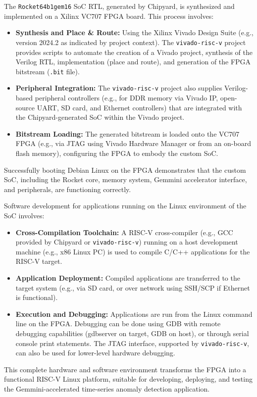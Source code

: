 The \texttt{Rocket64b1gem16} SoC RTL, generated by Chipyard, is synthesized and implemented on a Xilinx VC707 FPGA board. This process involves:
\begin{itemize}
    \item \textbf{Synthesis and Place \& Route:} Using the Xilinx Vivado Design Suite (e.g., version 2024.2 as indicated by project context). The \texttt{vivado-risc-v} project provides scripts to automate the creation of a Vivado project, synthesis of the Verilog RTL, implementation (place and route), and generation of the FPGA bitstream (\texttt{.bit} file).
    \item \textbf{Peripheral Integration:} The \texttt{vivado-risc-v} project also supplies Verilog-based peripheral controllers (e.g., for DDR memory via Vivado IP, open-source UART, SD card, and Ethernet controllers) that are integrated with the Chipyard-generated SoC within the Vivado project.
    \item \textbf{Bitstream Loading:} The generated bitstream is loaded onto the VC707 FPGA (e.g., via JTAG using Vivado Hardware Manager or from an on-board flash memory), configuring the FPGA to embody the custom SoC.
\end{itemize}
Successfully booting Debian Linux on the FPGA demonstrates that the custom SoC, including the Rocket core, memory system, Gemmini accelerator interface, and peripherals, are functioning correctly.

Software development for applications running on the Linux environment of the SoC involves:
\begin{itemize}
    \item \textbf{Cross-Compilation Toolchain:} A RISC-V cross-compiler (e.g., GCC provided by Chipyard or \texttt{vivado-risc-v}) running on a host development machine (e.g., x86 Linux PC) is used to compile C/C++ applications for the RISC-V target.
    \item \textbf{Application Deployment:} Compiled applications are transferred to the target system (e.g., via SD card, or over network using SSH/SCP if Ethernet is functional).
    \item \textbf{Execution and Debugging:} Applications are run from the Linux command line on the FPGA. Debugging can be done using GDB with remote debugging capabilities (gdbserver on target, GDB on host), or through serial console print statements. The JTAG interface, supported by \texttt{vivado-risc-v}, can also be used for lower-level hardware debugging.
\end{itemize}
This complete hardware and software environment transforms the FPGA into a functional RISC-V Linux platform, suitable for developing, deploying, and testing the Gemmini-accelerated time-series anomaly detection application.